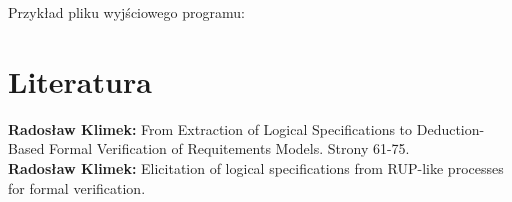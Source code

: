 \documentclass[a4paper, 11pt]{article}
\begin{document}
	Przykład pliku wyjściowego programu:
	
	
	\section{Literatura}
	\textbf{Radosław Klimek:} From Extraction of Logical Specifications to Deduction-Based Formal Verification of Requitements Models. Strony 61-75.\\
		\textbf{Radosław Klimek:} Elicitation of logical specifications from RUP-like processes for formal verification.\\
	
	
	
\end{document}
